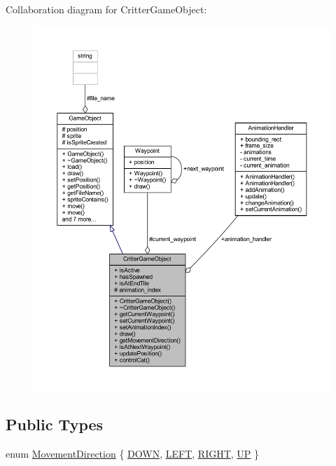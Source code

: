 Collaboration diagram for Critter\+Game\+Object\+:
\nopagebreak
\begin{figure}[H]
\begin{center}
\leavevmode
\includegraphics[width=350pt]{class_critter_game_object__coll__graph}
\end{center}
\end{figure}
\subsection*{Public Types}
\begin{DoxyCompactItemize}
\item 
enum \hyperlink{class_critter_game_object_a8d07276919d937f6066395bc0e1febf2}{Movement\+Direction} \{ \hyperlink{class_critter_game_object_a8d07276919d937f6066395bc0e1febf2ae3b729130fb185c409e639345a7de9ed}{D\+O\+W\+N}, 
\hyperlink{class_critter_game_object_a8d07276919d937f6066395bc0e1febf2a02ac339d40e010941fad9c94f3826214}{L\+E\+F\+T}, 
\hyperlink{class_critter_game_object_a8d07276919d937f6066395bc0e1febf2a66b911e14441f191d1477b704dc354b1}{R\+I\+G\+H\+T}, 
\hyperlink{class_critter_game_object_a8d07276919d937f6066395bc0e1febf2ad339e5942cb7217912a66c55116b7676}{U\+P}
 \}
\end{DoxyCompactItemize}
